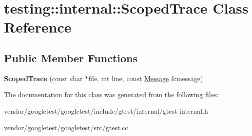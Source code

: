 \hypertarget{classtesting_1_1internal_1_1_scoped_trace}{}\section{testing\+:\+:internal\+:\+:Scoped\+Trace Class Reference}
\label{classtesting_1_1internal_1_1_scoped_trace}
\subsection*{Public Member Functions}
\begin{DoxyCompactItemize}
\item 
\mbox{\label{classtesting_1_1internal_1_1_scoped_trace_ab965d7010bbbc82c1bef6ebf8748bede}} 
{\bfseries Scoped\+Trace} (const char $\ast$file, int line, const \hyperlink{classtesting_1_1_message}{Message} \&message)
\end{DoxyCompactItemize}


The documentation for this class was generated from the following files\+:\begin{DoxyCompactItemize}
\item 
vendor/googletest/googletest/include/gtest/internal/gtest-\/internal.\+h\item 
vendor/googletest/googletest/src/gtest.\+cc\end{DoxyCompactItemize}
